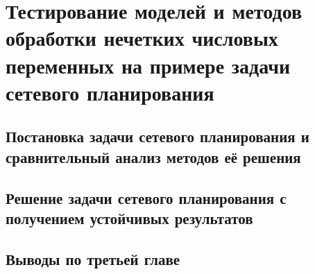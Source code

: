 \chapter{Тестирование моделей и методов обработки нечетких числовых переменных на примере задачи сетевого планирования}
\label{chapter3}

\section{Постановка задачи сетевого планирования и сравнительный анализ методов её решения} 
\label{chapter3_1}


\section{Решение задачи сетевого планирования с получением устойчивых результатов}
\label{chapter3_2}


\section*{Выводы по третьей главе} 
\label{chapter3_3}

